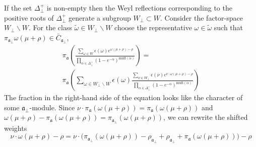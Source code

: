 \documentclass[12pt]{iopart}
\begin{document}
If the set $\Delta^{+}_{\bot}$ is non-empty then the Weyl reflections corresponding to the positive roots of $\Delta^{+}_{\bot}$ generate a subgroup $W_{\bot}\subset W$.
Consider the factor-space $W_{\bot}\backslash W$. For the class $\tilde{\omega}\in W_{\bot}\backslash W$ choose the representative $\omega \in \tilde{\omega}$ such that $\pi_{\mathfrak{a}_{\bot}}\omega(\mu+\rho)\in \bar{C}_{\mathfrak{a}_{\bot}}$,
\begin{eqnarray*}
  \label{eq:13}
 \pi_{\mathfrak{a}}\left(\frac{\sum_{\omega\in W} \epsilon(\omega) e^{\omega(\mu+\rho)-\rho}}{\prod_{\alpha\in\Delta^{+}_{\bot}}(1-e^{-\alpha})^{\mathrm{mult}(\alpha)}}\right) = \\
 \pi_{\mathfrak{a}}\left(\sum_{\omega\in W_{\bot}\backslash W} \epsilon(\omega) \frac{\sum_{\nu\in W_{\bot}}\epsilon(\nu) e^{\nu \cdot \omega(\mu+\rho)-\rho}}{\prod_{\alpha\in\Delta^{+}_{\bot}}(1-e^{-\alpha})^{\mathrm{mult}(\alpha)}}\right)
\end{eqnarray*}
The fraction in the right-hand side of the equation looks like the character of some  $\mathfrak{a}_{\bot}$-module.
Since $\nu\cdot \pi_{\mathfrak{a}}(\omega(\mu+\rho))=\pi_{\mathfrak{a}}(\omega(\mu+\rho))$ and $\omega(\mu+\rho)-\pi_{\mathfrak{a}}(\omega(\mu+\rho))=\pi_{\mathfrak{a}_{\bot}}(\omega(\mu+\rho))$, we can rewrite the shifted weights
\begin{equation}
  \label{eq:30}
  \nu\cdot\omega(\mu+\rho)-\rho=\nu\cdot \bigl(\pi_{\mathfrak{a}_{\bot}}(\omega(\mu+\rho))-\rho_{\mathfrak{a}_{\bot}}+\rho_{\mathfrak{a}_{\bot}}+\pi_{\mathfrak{a}}(\omega(\mu+\rho))\bigr)-\rho
\end{equation}
\end{document}
